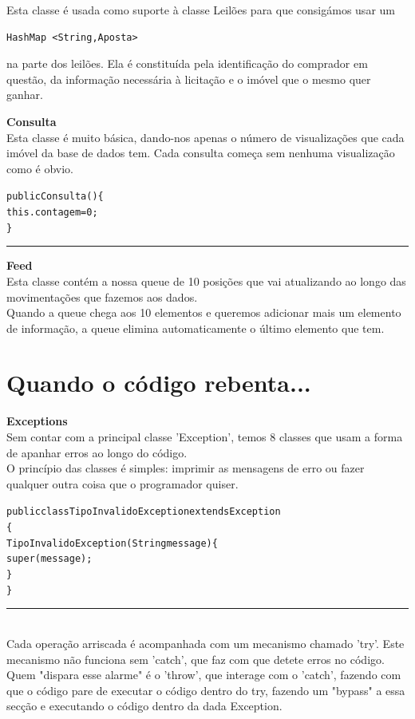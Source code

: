 \documentclass[12pt]{article}
\newenvironment{code}                    
{\textbf{
} \hspace{1cm} \hrulefill \\ 
\smallskip 
\begin{center}
\begin{minipage}{0.9\textwidth} 
\begin{alltt}\small}
{\end{alltt}
\end{minipage}
\end{center}
\hrule\smallskip
}
\begin{document}
Esta classe é usada como suporte à classe Leilões para que consigámos usar um 
\begin{verbatim}
HashMap <String,Aposta>
\end{verbatim}
na parte dos leilões.
Ela é constituída pela identificação do comprador em questão, da informação necessária à licitação e o imóvel que o mesmo quer ganhar.

\textbf{Consulta}
\newline
~\\

Esta classe é muito básica, dando-nos apenas o número de visualizações que cada imóvel da base de dados tem.
Cada consulta começa sem nenhuma visualização como é obvio.
\begin{code}
public Consulta()\{
        this.contagem = 0;
    \}
\end{code}


\textbf{Feed}
\newline
~\\

Esta classe contém a nossa queue de 10 posições que vai atualizando ao longo das movimentações que fazemos aos dados.
~\\

Quando a queue chega aos 10 elementos e queremos adicionar mais um elemento de informação, a queue elimina automaticamente o último elemento que tem.
\pagebreak

\section{Quando o código rebenta...}

\textbf{Exceptions}
\newline
~\\

Sem contar com a principal classe 'Exception', temos 8 classes que usam a forma de apanhar erros ao longo do código.
\\

O princípio das classes é simples: imprimir as mensagens de erro ou fazer qualquer outra coisa que o programador quiser.
\newline
\begin{code}
public class TipoInvalidoException extends Exception
\{
    TipoInvalidoException(String message)\{
       super(message);
    \}
\}
\end{code}
~\\

Cada operação arriscada é acompanhada com um mecanismo chamado 'try'. Este mecanismo não funciona sem 'catch', que faz com que detete erros no código. Quem "dispara esse alarme" é o 'throw', que interage com o 'catch', fazendo com que o código pare de executar o código dentro do try, fazendo um "bypass" a essa secção e executando o código dentro da dada Exception. 
~\\
\end{document}
